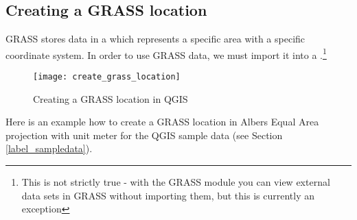 \subsection{Creating a GRASS location}\label{sec:create_loc}

GRASS stores data in a  which represents a specific area
with a specific coordinate system. In order to use GRASS data, we must import
it into a .\footnote{This is not strictly true - with the
GRASS module  you can view external data sets in GRASS
without importing them, but this is currently an exception}

\begin{figure}[ht]
\begin{center}
\caption{Creating a GRASS location in QGIS \nixcaption}\label{fig:grass_location}\smallskip
\texttt{[image: create\_grass\_location]}
\end{center}  
\end{figure}

Here is an example how to create a GRASS location in Albers Equal Area 
projection with unit meter for the QGIS sample data (see Section \ref{label_sampledata}). 

